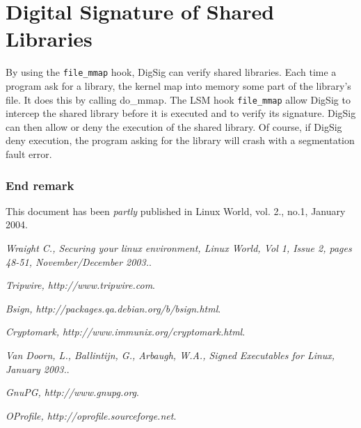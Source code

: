 \documentclass{article}
\begin{document}
\section{Digital Signature of Shared Libraries}

By using the {\tt file_mmap} hook, DigSig can verify shared libraries.
Each time a program ask for a library, the kernel map into memory some
part of the library's file.  It does this by calling do_mmap.  The LSM hook 
{\tt file_mmap} allow DigSig to intercep the shared library before it is 
executed and to verify its signature. DigSig can then allow or deny the
execution of the shared library.  Of course, if DigSig deny execution, the
program asking for the library will crash with a segmentation fault error.

\subsubsection*{End remark}

{\small This document has been {\it partly} published in Linux World, vol. 2., no.1, January 2004.}

\begin{thebibliography}{99}

  {\em Wraight C., Securing your linux environment, Linux World, Vol 1, 
    Issue 2, pages 48-51, November/December 2003.}.

  {\em Tripwire, http://www.tripwire.com}.

  {\em Bsign, http://packages.qa.debian.org/b/bsign.html}. 

  {\em Cryptomark, http://www.immunix.org/cryptomark.html}.

  {\em Van Doorn, L., Ballintijn, G., Arbaugh, W.A., Signed Executables for Linux, January 2003.}.

  {\em GnuPG, http://www.gnupg.org}. 

  {\em OProfile, http://oprofile.sourceforge.net}. 


\end{thebibliography}
\end{document}
